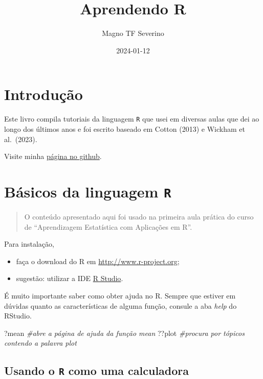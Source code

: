 \documentclass[
]{book}
\title{Aprendendo R}
\author{Magno TF Severino}
\date{2024-01-12}
\newenvironment{Shaded}{\begin{snugshade}}{\end{snugshade}}
\newcommand{\CommentTok}[1]{\textcolor[rgb]{0.56,0.35,0.01}{\textit{#1}}}
\newcommand{\NormalTok}[1]{#1}
\begin{document}
\maketitle

{
\setcounter{tocdepth}{1}
\tableofcontents
}
\chapter*{Introdução}\label{introduuxe7uxe3o}

Este livro compila tutoriais da linguagem \texttt{R} que usei em diversas aulas que dei ao longo dos últimos anos e foi escrito baseado em Cotton (2013) e Wickham et al.~(2023).

Visite minha \href{https://magnotairone.github.io/}{página no github}.

\chapter{\texorpdfstring{Básicos da linguagem \texttt{R}}{Básicos da linguagem R}}\label{buxe1sicos-da-linguagem-r}

\begin{quote}
O conteúdo apresentado aqui foi usado na primeira aula prática do curso de ``Aprendizagem Estatística com Aplicações em R''.
\end{quote}

Para instalação,

\begin{itemize}
\item
  faça o download do R em \url{http://www.r-project.org};
\item
  sugestão: utilizar a IDE \href{http://www.rstudio.org}{R Studio}.
\end{itemize}

É muito importante saber como obter ajuda no R.
Sempre que estiver em dúvidas quanto as características de alguma função, consule a aba \emph{help} do RStudio.

\begin{Shaded}
\begin{Highlighting}[]
\NormalTok{?mean }\CommentTok{\#abre a página de ajuda da função \textquotesingle{}mean\textquotesingle{}}
\NormalTok{??plot }\CommentTok{\#procura por tópicos contendo a palavra \textquotesingle{}plot\textquotesingle{}}
\end{Highlighting}
\end{Shaded}

\section{\texorpdfstring{Usando o \texttt{R} como uma calculadora}{Usando o R como uma calculadora}}\label{usando-o-r-como-uma-calculadora}
\end{document}
